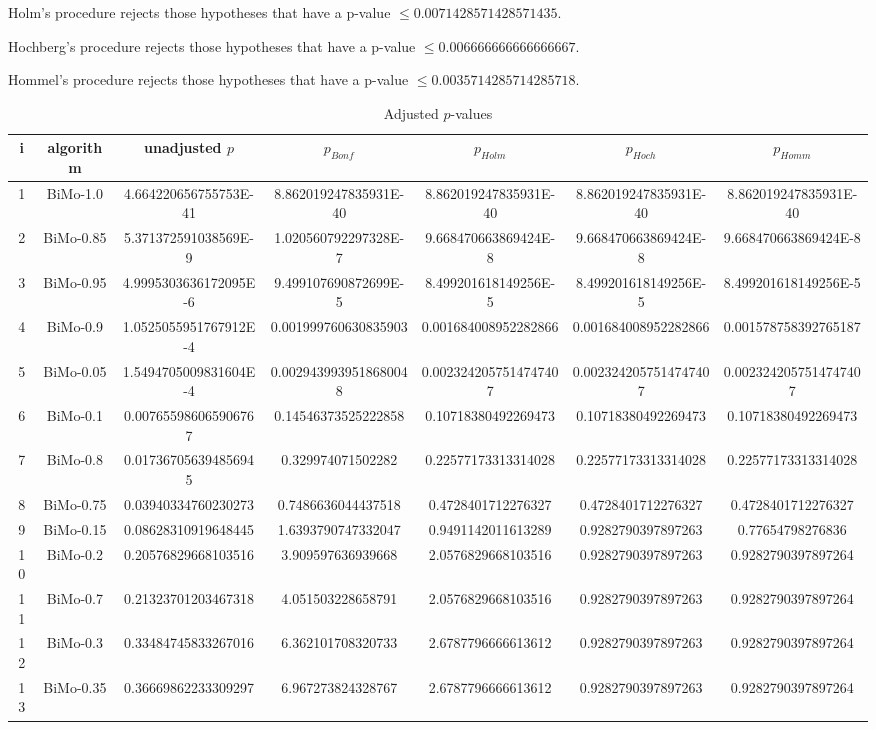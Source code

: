 \documentclass[a4paper,10pt]{article}
\begin{document}
\begin{landscape}
Holm's procedure rejects those hypotheses that have a p-value $\le0.0071428571428571435$.


Hochberg's procedure rejects those hypotheses that have a p-value $\le0.006666666666666667$.


Hommel's procedure rejects those hypotheses that have a p-value $\le0.0035714285714285718$.


\begin{table}[!htp]
\centering\tiny
\caption{Adjusted $p$-values}
\begin{tabular}{ccccccc}
i&algorithm&unadjusted $p$&$p_{Bonf}$&$p_{Holm}$&$p_{Hoch}$&$p_{Homm}$\\
\hline
1&BiMo-1.0&4.664220656755753E-41&8.862019247835931E-40&8.862019247835931E-40&8.862019247835931E-40&8.862019247835931E-40\\
2&BiMo-0.85&5.371372591038569E-9&1.020560792297328E-7&9.668470663869424E-8&9.668470663869424E-8&9.668470663869424E-8\\
3&BiMo-0.95&4.9995303636172095E-6&9.499107690872699E-5&8.499201618149256E-5&8.499201618149256E-5&8.499201618149256E-5\\
4&BiMo-0.9&1.0525055951767912E-4&0.001999760630835903&0.001684008952282866&0.001684008952282866&0.001578758392765187\\
5&BiMo-0.05&1.5494705009831604E-4&0.0029439939518680048&0.0023242057514747407&0.0023242057514747407&0.0023242057514747407\\
6&BiMo-0.1&0.007655986065906767&0.14546373525222858&0.10718380492269473&0.10718380492269473&0.10718380492269473\\
7&BiMo-0.8&0.017367056394856945&0.329974071502282&0.22577173313314028&0.22577173313314028&0.22577173313314028\\
8&BiMo-0.75&0.03940334760230273&0.7486636044437518&0.4728401712276327&0.4728401712276327&0.4728401712276327\\
9&BiMo-0.15&0.08628310919648445&1.6393790747332047&0.9491142011613289&0.9282790397897263&0.77654798276836\\
10&BiMo-0.2&0.20576829668103516&3.909597636939668&2.0576829668103516&0.9282790397897263&0.9282790397897264\\
11&BiMo-0.7&0.21323701203467318&4.051503228658791&2.0576829668103516&0.9282790397897263&0.9282790397897264\\
12&BiMo-0.3&0.33484745833267016&6.362101708320733&2.6787796666613612&0.9282790397897263&0.9282790397897264\\
13&BiMo-0.35&0.36669862233309297&6.967273824328767&2.6787796666613612&0.9282790397897263&0.9282790397897264\\

\end{tabular}
\end{table}
\end{landscape}
\end{document}

